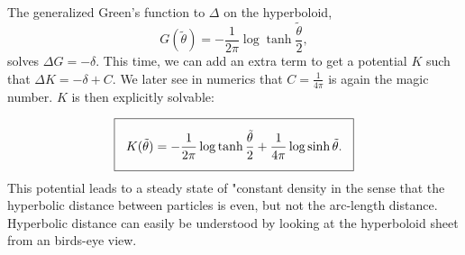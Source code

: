 \documentclass{article}
\newcommand{\h}{\theta}
\begin{document}
The generalized Green's function to $\Delta$ on the hyperboloid, 
\[
G( \tilde{\h} ) = - \frac{1}{2\pi} \log{ \tanh{\frac{\tilde{\h}}{2}}},
\]
solves $\Delta G = -\delta$. This time, we can add an extra term to get a potential $K$ such that $\Delta K = -\delta + C$. We later see in numerics that $C = \frac{1}{4\pi}$ is again the magic number. $K$ is then explicitly solvable:

\[
\setlength{\fboxsep}{3\fboxsep}\boxed{
K(\tilde{\h}) = -\frac{1}{2\pi} \log{ \tanh{ \frac{\tilde{\h}}{2}}} + \frac{1}{4\pi} \log{ \sinh{ \tilde{\h}}}.
}
\]
This potential leads to a steady state of "constant density in the sense that the hyperbolic distance between particles is even, but not the arc-length distance. Hyperbolic distance can easily be understood by looking at the hyperboloid sheet from an birds-eye view.
\end{document}

